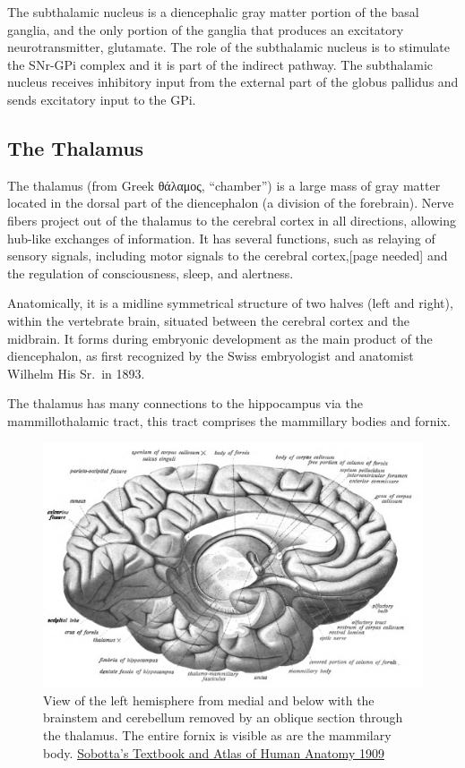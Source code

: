 The subthalamic nucleus is a diencephalic gray matter portion of the basal ganglia, and the only portion of the ganglia that produces an excitatory neurotransmitter, glutamate. The role of the subthalamic nucleus is to stimulate the SNr-GPi complex and it is part of the indirect pathway. The subthalamic nucleus receives inhibitory input from the external part of the globus pallidus and sends excitatory input to the GPi.

\hypertarget{the-thalamus}{%
\subsection{The Thalamus}\label{the-thalamus}}

The thalamus (from Greek θάλαμος, ``chamber'') is a large mass of gray matter located in the dorsal part of the diencephalon (a division of the forebrain). Nerve fibers project out of the thalamus to the cerebral cortex in all directions, allowing hub-like exchanges of information. It has several functions, such as relaying of sensory signals, including motor signals to the cerebral cortex,{[}page needed{]} and the regulation of consciousness, sleep, and alertness.

Anatomically, it is a midline symmetrical structure of two halves (left and right), within the vertebrate brain, situated between the cerebral cortex and the midbrain. It forms during embryonic development as the main product of the diencephalon, as first recognized by the Swiss embryologist and anatomist Wilhelm His Sr.~in 1893.

The thalamus has many connections to the hippocampus via the mammillothalamic tract, this tract comprises the mammillary bodies and fornix.



\begin{figure}

{\centering \includegraphics[width=0.7\linewidth]{./figures/cns/Sobo_1909_634} 

}

\caption{View of the left hemisphere from medial and below with the brainstem and cerebellum removed by an oblique section through the thalamus. The entire fornix is visible as are the mammilary body. \href{https://commons.wikimedia.org/wiki/File:Sobo_1909_634.png}{Sobotta's Textbook and Atlas of Human Anatomy 1909}}\label{fig:thalamusview}
\end{figure}

